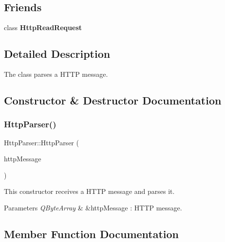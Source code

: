 \subsection*{Friends}
\begin{DoxyCompactItemize}
\item 
\mbox{\label{class_http_parser_a4d54f5003e07e218070a449c22a52c7c}} 
class {\bfseries Http\+Read\+Request}
\end{DoxyCompactItemize}


\subsection{Detailed Description}
The class parses a H\+T\+TP message. 

\subsection{Constructor \& Destructor Documentation}
\mbox{\label{class_http_parser_a91e6c1876337b53694347476f277d1a2}} 
\subsubsection{\texorpdfstring{Http\+Parser()}{HttpParser()}}
{\footnotesize\ttfamily Http\+Parser\+::\+Http\+Parser (\begin{DoxyParamCaption}\item[{Q\+Byte\+Array \&}]{http\+Message }\end{DoxyParamCaption})\hspace{0.3cm}{\ttfamily [explicit]}}



This constructor receives a H\+T\+TP message and parses it. 


\begin{DoxyParams}{Parameters}
{\em Q\+Byte\+Array} & \&http\+Message \+: H\+T\+TP message. \\
\hline
\end{DoxyParams}


\subsection{Member Function Documentation}
\mbox{\label{class_http_parser_abeee6e30f6494121010bc5498b162870}} 
